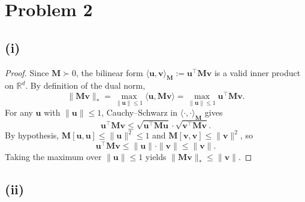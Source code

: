 \section*{Problem 2}

\subsection*{(i)}

\begin{proof}
Since $\mathbf{M} \succ 0$, the bilinear form $\langle \mathbf{u}, \mathbf{v} \rangle_{\mathbf{M}} := \mathbf{u}^\top \mathbf{M} \mathbf{v}$ is a valid inner product on $\mathbb{R}^d$. By definition of the dual norm,
\[
\|\mathbf{M}\mathbf{v}\|_* = \max_{\|\mathbf{u}\| \leq 1} \langle \mathbf{u}, \mathbf{M}\mathbf{v} \rangle = \max_{\|\mathbf{u}\| \leq 1} \mathbf{u}^\top \mathbf{M} \mathbf{v}.
\]
For any $\mathbf{u}$ with $\|\mathbf{u}\| \leq 1$, Cauchy--Schwarz in $\langle \cdot, \cdot \rangle_{\mathbf{M}}$ gives
\[
\mathbf{u}^\top \mathbf{M} \mathbf{v} \leq \sqrt{\mathbf{u}^\top \mathbf{M} \mathbf{u}} \cdot \sqrt{\mathbf{v}^\top \mathbf{M} \mathbf{v}}.
\]
By hypothesis, $\mathbf{M}[\mathbf{u}, \mathbf{u}] \leq \|\mathbf{u}\|^2 \leq 1$ and $\mathbf{M}[\mathbf{v}, \mathbf{v}] \leq \|\mathbf{v}\|^2$, so
\[
\mathbf{u}^\top \mathbf{M} \mathbf{v} \leq \|\mathbf{u}\| \cdot \|\mathbf{v}\| \leq \|\mathbf{v}\|.
\]
Taking the maximum over $\|\mathbf{u}\| \leq 1$ yields $\|\mathbf{M}\mathbf{v}\|_* \leq \|\mathbf{v}\|$.
\end{proof}

\subsection*{(ii)}

